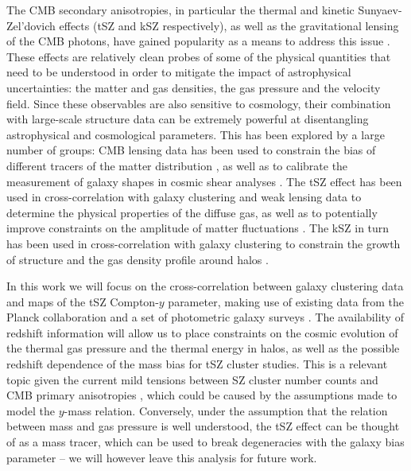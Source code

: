 \documentclass[useAMS,usenatbib]{mn2e}
\begin{document}
  The CMB secondary anisotropies, in particular the thermal and kinetic Sunyaev-Zel'dovich effects (tSZ and kSZ respectively), as well as the gravitational lensing of the CMB photons, have gained popularity as a means to address this issue \citep{2017JCAP...11..040B,2019BAAS...51c.297B}. These effects are relatively clean probes of some of the physical quantities that need to be understood in order to mitigate the impact of astrophysical uncertainties: the matter and gas densities, the gas pressure and the velocity field. Since these observables are also sensitive to cosmology, their combination with large-scale structure data can be extremely powerful at disentangling astrophysical and cosmological parameters. This has been explored by a large number of groups: CMB lensing data has been used to constrain the bias of different tracers of the matter distribution \citep[e.g.][]{2019MNRAS.485.1720H,2018JCAP...04..053A,2018arXiv181002322A,2018MNRAS.481.1133P}, as well as to calibrate the measurement of galaxy shapes in cosmic shear analyses \citep{2017PhRvD..95l3512S}. The tSZ effect has been used in cross-correlation with galaxy clustering and weak lensing data to determine the physical properties of the diffuse gas, as well as to potentially improve constraints on the amplitude of matter fluctuations \citep{2014PhRvD..89b3508V,2014JCAP...02..030H,2015JCAP...09..046M,2017MNRAS.471.1565H,2017ApJ...845...71A,2018PhRvD..97f3514A,2018MNRAS.480.3928M,2019A&A...624A..48D,2019MNRAS.483..223T,2019arXiv190306654T,2019arXiv190413347P,2019arXiv190707870M}. The kSZ in turn has been used in cross-correlation with galaxy clustering to constrain the growth of structure and the gas density profile around halos \citep{2016PhRvD..93h2002S,2016A&A...586A.140P,2016PhRvL.117e1301H,2016MNRAS.461.3172S,2017JCAP...03..008D}.
  
  In this work we will focus on the cross-correlation between galaxy clustering data and maps of the tSZ Compton-$y$ parameter, making use of existing data from the Planck collaboration \citep{2016A&A...594A..22P} and a set of photometric galaxy surveys \citep{2014ApJS..210....9B,2016ApJS..225....5B}. The availability of redshift information will allow us to place constraints on the cosmic evolution of the thermal gas pressure and the thermal energy in halos, as well as the possible redshift dependence of the mass bias for tSZ cluster studies. This is a relevant topic given the current mild tensions between SZ cluster number counts and CMB primary anisotropies \citep{2016A&A...594A..24P,2016ApJ...832...95D,2019ApJ...878...55B,2019arXiv190407887Z}, which could be caused by the assumptions made to model the $y$-mass relation. Conversely, under the assumption that the relation between mass and gas pressure is well understood, the tSZ effect can be thought of as a mass tracer, which can be used to break degeneracies with the galaxy bias parameter -- we will however leave this analysis for future work.
\end{document}
